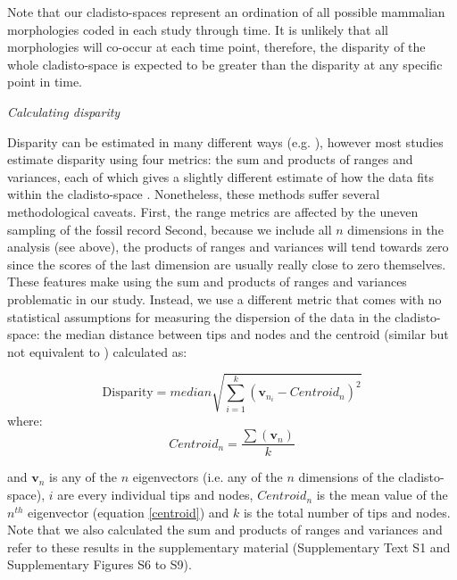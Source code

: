 \documentclass[12pt,letterpaper]{article}
\renewcommand{\subsection}[1]{%
\bigskip
\begin{center}
\begin{large}
\normalfont\itshape #1
\end{large}
\end{center}}
\begin{document}
Note that our cladisto-spaces represent an ordination of all possible mammalian morphologies coded in each study through time.
It is unlikely that all morphologies will co-occur at each time point, therefore, the disparity of the whole cladisto-space is expected to be greater than the disparity at any specific point in time.

\subsection{Calculating disparity}
Disparity can be estimated in many different ways (e.g. \cite{Wills1994,Ciampaglio2001}), however most studies estimate disparity using four metrics: the sum and products of ranges and variances, each of which gives a slightly different estimate of how the data fits within the cladisto-space \cite{Wills1994,brusatte50,Brusatte12092008,toljagictriassic-jurassic2013,ruta2013,bensonfaunal2014}.
Nonetheless, these methods suffer several methodological caveats.
First, the range metrics are affected by the uneven sampling of the fossil record \cite{Butler2012}
Second, because we include all $n$ dimensions in the analysis (see above), the products of ranges and variances will tend towards zero since the scores of the last dimension are usually really close to zero themselves. 
These features make using the sum and products of ranges and variances problematic in our study.
Instead, we use a different metric that comes with no statistical assumptions for measuring the dispersion of the data in the cladisto-space: the median distance between tips and nodes and the centroid (similar but not equivalent to \cite{Wills1994,kornextinction2013}) calculated as:

\begin{equation}
   \text{Disparity}=median{\displaystyle\sqrt{\sum_{i=1}^{k}{(\mathbf{v}_{n_{i}}-Centroid_{n})^2}}}
    \label{disparity}
\end{equation}
where:
\begin{equation}
    Centroid_{n}=\frac{\displaystyle\sum(\mathbf{v}_{n})}{k} 
    \label{centroid}
\end{equation}

\noindent
and $\mathbf{v}_{n}$ is any of the $n$ eigenvectors (i.e. any of the $n$ dimensions of the cladisto-space), $i$ are every individual tips and nodes, $Centroid_{n}$ is the mean value of the $n^{th}$ eigenvector (equation \ref{centroid}) and $k$ is the total number of tips and nodes.
Note that we also calculated the sum and products of ranges and variances and refer to these results in the supplementary material (Supplementary Text S1 and Supplementary Figures S6 to S9).
\end{document}
